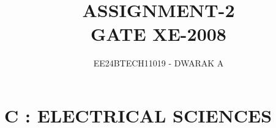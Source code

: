 \documentclass[journal]{IEEEtran}
\begin{document}

\vspace{3cm}

\title{\textbf{ASSIGNMENT-2\\GATE XE-2008}}
\author{EE24BTECH11019 - DWARAK A}
\maketitle

\bigskip

\renewcommand{\thefigure}{\theenumi}
\renewcommand{\thetable}{\theenumi}

\section*{C : ELECTRICAL SCIENCES}

\bigskip
\end{document}
